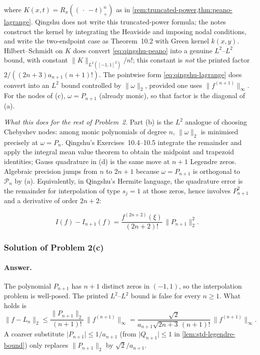 \documentclass[11pt,a4paper]{article}
\begin{document}
\begin{remark}
where \(K(x,t)=R_{x}((\,\cdot\,-t)_{+}^{n})\) as in \cref{rem:truncated-power,thm:peano-lagrange}. Qingshu does not write this truncated-power formula; the notes construct the kernel by integrating the Heaviside and imposing nodal conditions, and write the two-endpoint case as Theorem~10.2 with Green kernel \(k(x,y)\). Hilbert--Schmidt on \(K\) does convert \eqref{eq:qingshu-peano} into a genuine \(L^{2}\)--\(L^{2}\) bound, with constant \(\lVert K\rVert_{L^{2}([-1,1]^{2})}/n!\); this constant is \emph{not} the printed factor \(2/((2n+3)a_{n+1}(n+1)!)\). The pointwise form \eqref{eq:qingshu-lagrange} does convert into an \(L^{2}\) bound controlled by \(\lVert\omega\rVert_{2}\), provided one uses \(\lVert f^{(n+1)}\rVert_{\infty}\). For the nodes of (c), \(\omega=P_{n+1}\) (already monic), so that factor is the diagonal of (a).

\emph{What this does for the rest of Problem~2.}
Part (b) is the \(L^{2}\) analogue of choosing Chebyshev nodes: among monic polynomials of degree \(n\), \(\lVert\omega\rVert_{2}\) is minimised precisely at \(\omega=P_{n}\). Qingshu's Exercises~10.4--10.5 integrate the remainder and apply the integral mean value theorem to obtain the midpoint and trapezoid identities; Gauss quadrature in (d) is the same move at \(n+1\) Legendre zeros. Algebraic precision jumps from \(n\) to \(2n+1\) because \(\omega=P_{n+1}\) is orthogonal to \(\mathcal{P}_{n}\) by (a). Equivalently, in Qingshu's Hermite language, the quadrature error is the remainder for interpolation of type \(s_{j}=1\) at those zeros, hence involves \(P_{n+1}^{2}\) and a derivative of order \(2n+2\):

\[
I(f)-I_{n+1}(f)
=
\frac{f^{(2n+2)}(\xi)}{(2n+2)!}\,\lVert P_{n+1}\rVert_{2}^{2}.
\]
\end{remark}

\subsubsection{Solution of Problem 2(c)}

\paragraph{Answer.}
The polynomial \(P_{n+1}\) has \(n+1\) distinct zeros in \((-1,1)\), so the interpolation problem is well-posed. The printed \(L^{2}\)--\(L^{2}\) bound is false for every \(n\ge 1\). What holds is
\[
\|f-L_{n}\|_{2}
\le
\frac{\|P_{n+1}\|_{2}}{(n+1)!}\,\|f^{(n+1)}\|_{\infty}
=
\frac{\sqrt{2}}{a_{n+1}\sqrt{2n+3}\,(n+1)!}\,\|f^{(n+1)}\|_{\infty}.
\]
A coarser substitute \(\lvert P_{n+1}\rvert\le 1/a_{n+1}\) (from \(\lvert Q_{n+1}\rvert\le 1\) in \cref{lem:std-legendre-bound}) only replaces \(\|P_{n+1}\|_{2}\) by \(\sqrt{2}/a_{n+1}\).
\end{document}
